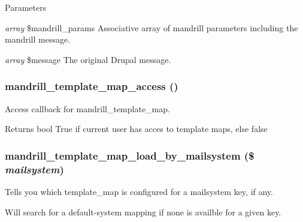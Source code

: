 \begin{DoxyParams}{Parameters}
\item[{\em array}]\$mandrill\_\-params Associative array of mandrill parameters including the mandrill message.\item[{\em array}]\$message The original Drupal message. \end{DoxyParams}
\hypertarget{mandrill__template_8module_a6a451669be92b42b30f8ef8ffa9cb315}{
\subsubsection[{mandrill\_\-template\_\-map\_\-access}]{\setlength{\rightskip}{0pt plus 5cm}mandrill\_\-template\_\-map\_\-access ()}}
\label{mandrill__template_8module_a6a451669be92b42b30f8ef8ffa9cb315}
Access callback for mandrill\_\-template\_\-map.

\begin{DoxyReturn}{Returns}
bool True if current user has acces to template maps, else false 
\end{DoxyReturn}
\hypertarget{mandrill__template_8module_a7f2ce537053644baac78cca50aff8c8f}{
\subsubsection[{mandrill\_\-template\_\-map\_\-load\_\-by\_\-mailsystem}]{\setlength{\rightskip}{0pt plus 5cm}mandrill\_\-template\_\-map\_\-load\_\-by\_\-mailsystem (\$ {\em mailsystem})}}
\label{mandrill__template_8module_a7f2ce537053644baac78cca50aff8c8f}
Tells you which template\_\-map is configured for a mailsystem key, if any.

Will search for a default-\/system mapping if none is availble for a given key.


